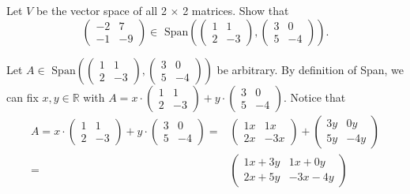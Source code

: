 \documentclass[12pt]{article}
\newenvironment{problem}[2][Problem]
{
	\begin{trivlist} 
		\item[\hskip \labelsep {\bfseries #1 #2:}]
	}
{
	\end{trivlist}
	}
\newenvironment{solution}[1][Solution]
{
	\begin{trivlist} 
		\item[\hskip \labelsep {\itshape #1:}]
	}
	{
	\end{trivlist}
}
\begin{document}
\newpage
\begin{problem}{3}
Let $V$ be the vector space of all 2 $\times$ 2 matrices. Show that
\[
\begin{pmatrix} -2&7\\-1&-9 \end{pmatrix} \in \text{ Span} \left( \begin{pmatrix} 1&1\\2&-3 \end{pmatrix}, \begin{pmatrix} 3&0\\5&-4 \end{pmatrix} \right) \text{.}
\]
\noindent
\newline
\newline
\begin{solution}
Let $A \in \text{ Span} \left( \begin{pmatrix} 1&1\\2&-3 \end{pmatrix}, \begin{pmatrix} 3&0\\5&-4 \end{pmatrix} \right)$ be arbitrary. By definition of Span, we can fix $x,y \in \mathbb{R}$ with $A = x\cdot \begin{pmatrix} 1&1\\2&-3 \end{pmatrix} + y\cdot \begin{pmatrix} 3&0\\5&-4 \end{pmatrix}$. Notice that
\begin{align*}
A=x\cdot \begin{pmatrix} 1&1\\2&-3 \end{pmatrix} + y\cdot \begin{pmatrix} 3&0\\5&-4 \end{pmatrix}=&  \begin{pmatrix} 1x&1x\\2x&-3x \end{pmatrix} + \begin{pmatrix} 3y&0y\\5y&-4y \end{pmatrix}\\
=&\begin{pmatrix} 1x+3y&1x+0y\\2x+5y&-3x-4y \end{pmatrix} 
\end{align*}

\end{solution}
\end{problem}
\end{document}
